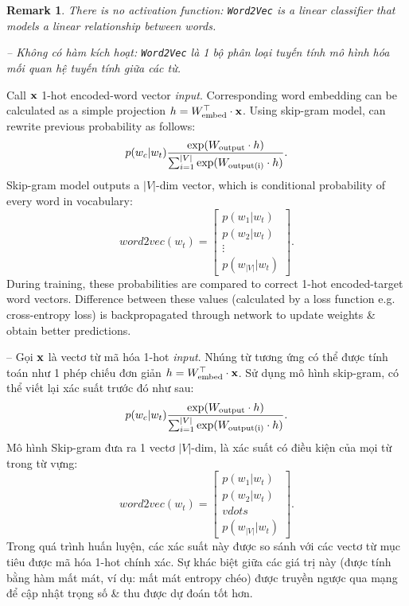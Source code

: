 \documentclass{article}
\newtheorem{remark}{Remark}
\begin{document}
\begin{itemize}
\begin{itemize}
\begin{itemize}
            \begin{remark}
                There is no activation function: {\tt Word2Vec} is a linear classifier that models a linear relationship between words.

                -- Không có hàm kích hoạt: {\tt Word2Vec} là 1 bộ phân loại tuyến tính mô hình hóa mối quan hệ tuyến tính giữa các từ.
            \end{remark}
            Call ${\bf x}$ 1-hot encoded-word vector {\it input}. Corresponding word embedding can be calculated as a simple projection $h = W_{\rm embed}^\top\cdot{\bf x}$. Using skip-gram model, can rewrite previous probability as follows:
            \begin{equation*}
                p(w_c|w_t) \frac{\exp(W_{\rm output}\cdot h)}{\sum_{i=1}^{|V|} \exp(W_{\rm output(i)}\cdot h)}.
            \end{equation*}
            Skip-gram model outputs a $|V|$-dim vector, which is conditional probability of every word in vocabulary:
            \begin{equation*}
                word2vec(w_t) = \begin{bmatrix}
                    p(w_1|w_t)\\p(w_2|w_t)\\\vdots\\p(w_{|V|}|w_t)
                \end{bmatrix}.
            \end{equation*}
            During training, these probabilities are compared to correct 1-hot encoded-target word vectors. Difference between these values (calculated by a loss function e.g. cross-entropy loss) is backpropagated through network to update weights \& obtain better predictions.

            -- Gọi ${\bf x}$ là vectơ từ mã hóa 1-hot {\it input}. Nhúng từ tương ứng có thể được tính toán như 1 phép chiếu đơn giản $h = W_{\rm embed}^\top\cdot{\bf x}$. Sử dụng mô hình skip-gram, có thể viết lại xác suất trước đó như sau:
            \begin{equation*}
                p(w_c|w_t) \frac{\exp(W_{\rm output}\cdot h)}{\sum_{i=1}^{|V|} \exp(W_{\rm output(i)}\cdot h)}.
            \end{equation*}
            Mô hình Skip-gram đưa ra 1 vectơ $|V|$-dim, là xác suất có điều kiện của mọi từ trong từ vựng:
            \begin{equation*}
                word2vec(w_t) = \begin{bmatrix}
                    p(w_1|w_t)\\p(w_2|w_t)\\vdots\\p(w_{|V|}|w_t)
                \end{bmatrix}.
            \end{equation*}
            Trong quá trình huấn luyện, các xác suất này được so sánh với các vectơ từ mục tiêu được mã hóa 1-hot chính xác. Sự khác biệt giữa các giá trị này (được tính bằng hàm mất mát, ví dụ: mất mát entropy chéo) được truyền ngược qua mạng để cập nhật trọng số \& thu được dự đoán tốt hơn.


\end{itemize}
\end{itemize}
\end{itemize}
\end{document}
